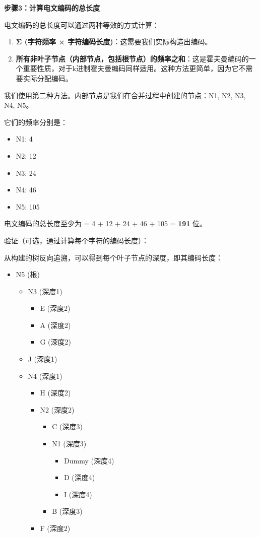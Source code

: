 \textbf{步骤3：计算电文编码的总长度}

电文编码的总长度可以通过两种等效的方式计算：

\begin{enumerate}
	\item \textbf{Σ (字符频率 × 字符编码长度)}：这需要我们实际构造出编码。
	\item \textbf{所有非叶子节点（内部节点，包括根节点）的频率之和}：这是霍夫曼编码的一个重要性质，对于k进制霍夫曼编码同样适用。这种方法更简单，因为它不需要实际分配编码。
\end{enumerate}

我们使用第二种方法。内部节点是我们在合并过程中创建的节点：N1, N2, N3, N4, N5。

它们的频率分别是：

\begin{itemize}
	\item N1: 4
	\item N2: 12
	\item N3: 24
	\item N4: 46
	\item N5: 105
\end{itemize}

电文编码的总长度至少为 = 4 + 12 + 24 + 46 + 105 = \textbf{191} 位。

验证（可选，通过计算每个字符的编码长度）：

从构建的树反向追溯，可以得到每个叶子节点的深度，即其编码长度：

\begin{itemize}
	\item N5 (根)
	\begin{itemize}
		\item N3 (深度1)
		\begin{itemize}
			\item E (深度2)
			\item A (深度2)
			\item G (深度2)
		\end{itemize}
		\item J (深度1)
		\item N4 (深度1)
		\begin{itemize}
			\item H (深度2)
			\item N2 (深度2)
			\begin{itemize}
				\item C (深度3)
				\item N1 (深度3)
				\begin{itemize}
					\item Dummy (深度4)
					\item D (深度4)
					\item I (深度4)
				\end{itemize}
				\item B (深度3)
			\end{itemize}
			\item F (深度2)
		\end{itemize}
	\end{itemize}
\end{itemize}

